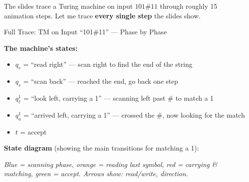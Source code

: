 \documentclass[11pt,a4paper]{article}
\begin{document}
The slides trace a Turing machine on input $101\#11$ through roughly 15 animation steps. Let me trace \textbf{every single step} the slides show.

\begin{examplebox}{Full Trace: TM on Input ``101\#11'' --- Phase by Phase}

\textbf{The machine's states:}
\begin{itemize}[nosep]
\item $q_r$ = ``read right'' --- scan right to find the end of the string
\item $q_s$ = ``scan back'' --- reached the end, go back one step
\item $q_\ell^1$ = ``look left, carrying a 1'' --- scanning left past \# to match a 1
\item $q_a^1$ = ``arrived left, carrying a 1'' --- crossed the \#, now looking for the match
\item $t$ = accept
\end{itemize}

\textbf{State diagram} (showing the main transitions for matching a 1):

\begin{center}
\end{center}

\textit{Blue = scanning phase, orange = reading last symbol, red = carrying \& matching, green = accept. Arrows show: read/write, direction.}


\end{examplebox}
\end{document}
